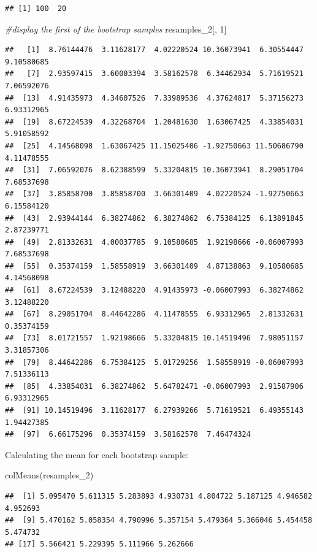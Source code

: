 \documentclass[
]{book}
\newenvironment{Shaded}{\begin{snugshade}}{\end{snugshade}}
\newcommand{\CommentTok}[1]{\textcolor[rgb]{0.56,0.35,0.01}{\textit{#1}}}
\newcommand{\DecValTok}[1]{\textcolor[rgb]{0.00,0.00,0.81}{#1}}
\newcommand{\FunctionTok}[1]{\textcolor[rgb]{0.00,0.00,0.00}{#1}}
\newcommand{\NormalTok}[1]{#1}
\begin{document}
\begin{verbatim}
## [1] 100  20
\end{verbatim}

\begin{Shaded}
\begin{Highlighting}[]
\CommentTok{\#display the first of the bootstrap samples}
\NormalTok{resamples\_2[, }\DecValTok{1}\NormalTok{]}
\end{Highlighting}
\end{Shaded}

\begin{verbatim}
##   [1]  8.76144476  3.11628177  4.02220524 10.36073941  6.30554447  9.10580685
##   [7]  2.93597415  3.60003394  3.58162578  6.34462934  5.71619521  7.06592076
##  [13]  4.91435973  4.34607526  7.33989536  4.37624817  5.37156273  6.93312965
##  [19]  8.67224539  4.32268704  1.20481630  1.63067425  4.33854031  5.91058592
##  [25]  4.14568098  1.63067425 11.15025406 -1.92750663 11.50686790  4.11478555
##  [31]  7.06592076  8.62388599  5.33204815 10.36073941  8.29051704  7.68537698
##  [37]  3.85858700  3.85858700  3.66301409  4.02220524 -1.92750663  6.15584120
##  [43]  2.93944144  6.38274862  6.38274862  6.75384125  6.13891845  2.87239771
##  [49]  2.81332631  4.00037785  9.10580685  1.92198666 -0.06007993  7.68537698
##  [55]  0.35374159  1.58558919  3.66301409  4.87138863  9.10580685  4.14568098
##  [61]  8.67224539  3.12488220  4.91435973 -0.06007993  6.38274862  3.12488220
##  [67]  8.29051704  8.44642286  4.11478555  6.93312965  2.81332631  0.35374159
##  [73]  8.01721557  1.92198666  5.33204815 10.14519496  7.98051157  3.31857306
##  [79]  8.44642286  6.75384125  5.01729256  1.58558919 -0.06007993  7.51336113
##  [85]  4.33854031  6.38274862  5.64782471 -0.06007993  2.91587906  6.93312965
##  [91] 10.14519496  3.11628177  6.27939266  5.71619521  6.49355143  1.94427385
##  [97]  6.66175296  0.35374159  3.58162578  7.46474324
\end{verbatim}

Calculating the mean for each bootstrap sample:

\begin{Shaded}
\begin{Highlighting}[]
\FunctionTok{colMeans}\NormalTok{(resamples\_2)}
\end{Highlighting}
\end{Shaded}

\begin{verbatim}
##  [1] 5.095470 5.611315 5.283893 4.930731 4.804722 5.187125 4.946582 4.952693
##  [9] 5.470162 5.058354 4.790996 5.357154 5.479364 5.366046 5.454458 5.474732
## [17] 5.566421 5.229395 5.111966 5.262666
\end{verbatim}
\end{document}
